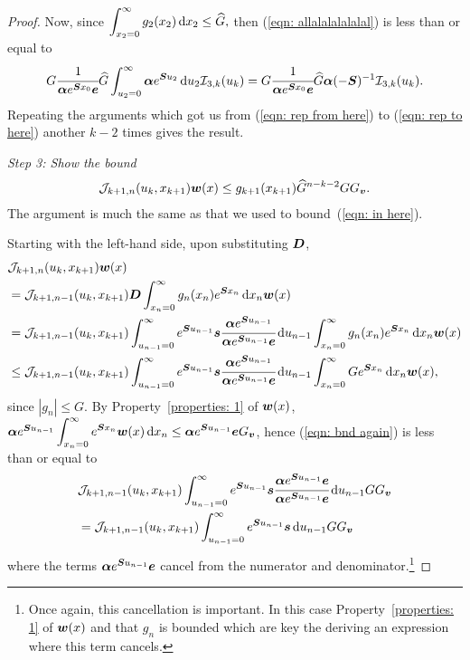 \begin{proof}
	Now, since \(\displaystyle \int_{x_2=0}^\infty g_2(x_2)\, \mathrm{d} x_2\leq \widehat G,\) then (\ref{eqn: allalalalalalal}) is less than or equal to 
	\begin{align}
		G  \cfrac{1}{\boldsymbol \alpha e^{\boldsymbol{S} x_0 }\boldsymbol e}  \widehat G  \int_{u_2=0}^\infty \boldsymbol \alpha e^{\boldsymbol{S}u_2} \, \mathrm{d} u_2 \mathcal I_{3,k}(u_k) 
		=G  \cfrac{1}{\boldsymbol \alpha e^{\boldsymbol{S} x_0 }\boldsymbol e}  \widehat G \boldsymbol \alpha (-\boldsymbol S)^{-1} \mathcal I_{3,k}(u_k).  \label{eqn: rep to here}
	\end{align}
	Repeating the arguments which got us from (\ref{eqn: rep from here}) to (\ref{eqn: rep to here}) another \(k-2\) times gives the result.

\emph{Step 3: Show the bound}
	\begin{align}
            	\mathcal J_{k+1,n}(u_k,x_{k+1})  {\boldsymbol w}(x) \leq  g_{k+1}(x_{k+1})\widehat G^{n-k-2} G G_{\boldsymbol v}. \label{eqn: J bound}
	\end{align}
	The argument is much the same as that we used to bound~(\ref{eqn: in here}).

	Starting with the left-hand side, upon substituting \(\boldsymbol{D}\), 
	\begin{align}
		& \mathcal J_{k+1,n}(u_k,x_{k+1})  {\boldsymbol w}(x)  \nonumber 
		\\&= \mathcal J_{k+1,n-1}(u_k,x_{k+1})  \boldsymbol{D}
		\int_{x_n=0}^\infty g_{n}(x_n) e^{\boldsymbol{S}x_n} \, \mathrm{d} x_n{\boldsymbol w}(x) \nonumber
		\\&= \mathcal J_{k+1,n-1}(u_k,x_{k+1})  \int_{u_{n-1}=0}^\infty e^{\boldsymbol{S}u_{n-1}}\boldsymbol s \cfrac{\boldsymbol \alpha e^{\boldsymbol{S}u_{n-1}}}{\boldsymbol \alpha e^{\boldsymbol{S}u_{n-1}}\boldsymbol e}\, \mathrm{d}  u_{n-1}
		\int_{x_n=0}^\infty g_{n}(x_n) e^{\boldsymbol{S}x_n} \, \mathrm{d} x_n{\boldsymbol w}(x) \nonumber
		\\&\leq \mathcal J_{k+1,n-1}(u_k,x_{k+1})  \int_{u_{n-1}=0}^\infty e^{\boldsymbol{S}u_{n-1}}\boldsymbol s \cfrac{\boldsymbol \alpha e^{\boldsymbol{S}u_{n-1}}}{\boldsymbol \alpha e^{\boldsymbol{S}u_{n-1}}\boldsymbol e}\, \mathrm{d}  u_{n-1}
		\int_{x_n=0}^\infty G e^{\boldsymbol{S}x_n} \, \mathrm{d} x_n{\boldsymbol w}(x), \label{eqn: bnd again}
	\end{align}
	since \(|g_n|\leq G\). 
	By Property~\ref{properties: 1} of \({\boldsymbol w}(x)\), \(\boldsymbol \alpha e^{\boldsymbol{S}u_{n-1}} \displaystyle\int_{x_n=0}^\infty e^{\boldsymbol{S}x_n} {\boldsymbol w}(x) \, \mathrm{d} x_n  \leq \boldsymbol \alpha e^{\boldsymbol{S}u_{n-1}}\boldsymbol eG_{\boldsymbol v}\), hence (\ref{eqn: bnd again}) is less than or equal to 
	\begin{align}
		&\mathcal J_{k+1,n-1}(u_k,x_{k+1})  \int_{u_{n-1}=0}^\infty e^{\boldsymbol{S}u_{n-1}}\boldsymbol s \cfrac{\boldsymbol \alpha e^{\boldsymbol{S}u_{n-1}}\boldsymbol e}{\boldsymbol \alpha e^{\boldsymbol{S}u_{n-1}}\boldsymbol e}\, \mathrm{d}  u_{n-1} G  G_{\boldsymbol v}\nonumber 
		\\& = \mathcal J_{k+1,n-1}(u_k,x_{k+1})  \int_{u_{n-1}=0}^\infty e^{\boldsymbol{S}u_{n-1}}\boldsymbol s \, \mathrm{d}  u_{n-1} G  G_{\boldsymbol v}\label{eqn: jjjjjjjj}
	\end{align}
	where the terms \(\boldsymbol \alpha e^{\boldsymbol{S}u_{n-1}}\boldsymbol e\) cancel from the numerator and denominator.\footnote{Once again, this cancellation is important. In this case Property~\ref{properties: 1} of \(\boldsymbol w(x)\) and that \(g_n\) is bounded which are key the deriving an expression where this term cancels.}


\end{proof}
